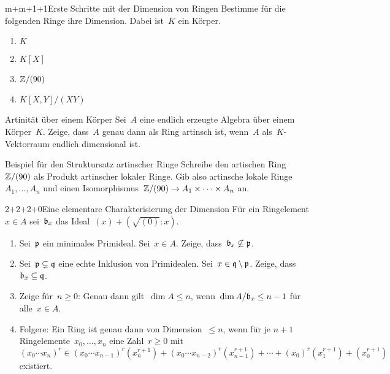 \documentclass[entwurf]{uebblatt}
\begin{document}

\begin{aufgabe}{m+m+1+1}{Erste Schritte mit der Dimension von Ringen}
Bestimme für die folgenden Ringe ihre Dimension. Dabei ist~$K$ ein Körper.
\begin{enumerate}
\item $K$
\item $K[X]$
\item $\mathbb{Z}/(90)$
\item $K[X,Y]/(XY)$
\end{enumerate}
\end{aufgabe}

\begin{aufgabe}{}{Artinität über einem Körper}
Sei~$A$ eine endlich erzeugte Algebra über einem Körper~$K$. Zeige, dass~$A$
genau dann als Ring artinsch ist, wenn~$A$ als~$K$-Vektorraum endlich
dimensional ist.
\end{aufgabe}

\begin{aufgabe}{}{Beispiel für den Struktursatz artinscher Ringe}
Schreibe den artischen Ring~$\mathbb{Z}/(90)$ als Produkt artinscher lokaler Ringe.
Gib also artinsche lokale Ringe~$A_1,\ldots,A_n$ und einen
Isomorphismus~$\mathbb{Z}/(90) \to A_1 \times \cdots \times A_n$ an.
\end{aufgabe}

\begin{aufgabe}{2+2+2+0}{Eine elementare Charakterisierung der Dimension}
Für ein Ringelement~$x \in A$ sei~$\mathfrak{b}_x$ das Ideal~$(x) + (\sqrt{(0)}:x)$.
\begin{enumerate}
\item Sei~$\mathfrak{p}$ ein minimales Primideal. Sei~$x \in A$. Zeige,
dass~$\mathfrak{b}_x \not\subseteq \mathfrak{p}$.
\item Sei~$\mathfrak{p} \subsetneq \mathfrak{q}$ eine echte Inklusion von Primidealen. Sei~$x
\in \mathfrak{q} \setminus \mathfrak{p}$. Zeige, dass~$\mathfrak{b}_x \subseteq \mathfrak{q}$.
\item Zeige für~$n \geq 0$: Genau dann gilt~$\dim A \leq n$, wenn~$\dim
A/\mathfrak{b}_x \leq n - 1$ für alle~$x \in A$.
\item Folgere: Ein Ring ist genau dann von Dimension~$\leq n$, wenn für
je $n+1$ Ringelemente~$x_0,\ldots,x_n$ eine Zahl~$r \geq 0$ mit
\[ (x_0 \cdots x_n)^r \in (x_0 \cdots x_{n-1})^r (x_n^{r+1}) +
  (x_0 \cdots x_{n-2})^r (x_{n-1}^{r+1}) + \cdots +
  (x_0)^r (x_1^{r+1}) + (x_0^{r+1}) \]
existiert.
\end{enumerate}
\end{aufgabe}
\end{document}
